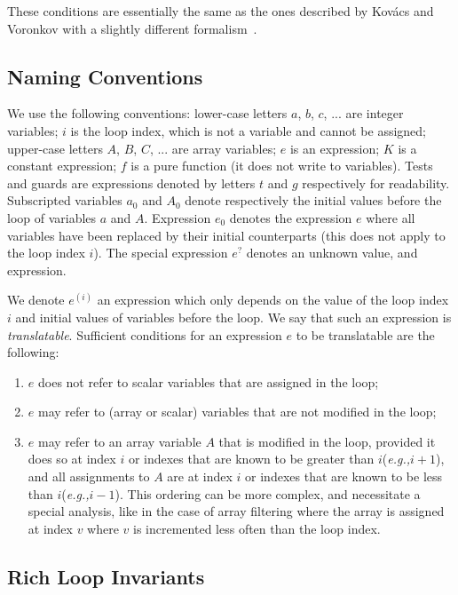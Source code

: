 \documentclass[a4paper,10pt]{article}
\newcommand{\eg}{\textit{e.g.,}\xspace}
\newcommand{\idx}{\ensuremath{i}\xspace}
\newcommand{\at}[1]{{(#1)}}
\newcommand{\translatable}{translatable}
\begin{document}
These conditions are essentially the same as the ones described by Kov\'acs and
Voronkov with a slightly different formalism~\cite{kovacs:2009:fli}.

\subsection{Naming Conventions}
\label{sec:naming-conventions}

We use the following conventions: lower-case letters $a$, $b$, $c$, ... are integer
variables; \idx is the loop index, which is not a variable and cannot be
assigned; upper-case letters $A$, $B$, $C$, ... are array variables; $e$ is an
expression; $K$ is a constant expression; $f$ is a pure function (it does not
write to variables). Tests and guards are expressions denoted by letters $t$ and
$g$ respectively for readability. Subscripted variables $a_0$ and $A_0$ denote
respectively the initial values before the loop of variables $a$ and
$A$. Expression $e_0$ denotes the expression $e$ where all variables have been
replaced by their initial counterparts (this does not apply to the loop index
\idx).  The special expression $e^?$ denotes an unknown value, and expression.

We denote $e^\at{\idx}$ an expression which only depends on the value of the
loop index \idx and initial values of variables before the loop. We say that
such an expression is \textit{\translatable}. Sufficient conditions for an
expression $e$ to be translatable are the following:
\begin{enumerate}
\item $e$ does not refer to scalar variables that are assigned in the loop;
\item $e$ may refer to (array or scalar) variables that are not modified in the loop;
\item $e$ may refer to an array variable $A$ that is modified in the loop,
  provided it does so at index \idx or indexes that are known to be greater
  than \idx (\eg $\idx + 1$), and all assignments to $A$ are at index \idx or
  indexes that are known to be less than \idx (\eg $\idx - 1$). This ordering
  can be more complex, and necessitate a special analysis, like in the case of
  array filtering where the array is assigned at index $v$ where $v$ is
  incremented less often than the loop index.
\end{enumerate}

\subsection{Rich Loop Invariants}
\end{document}
